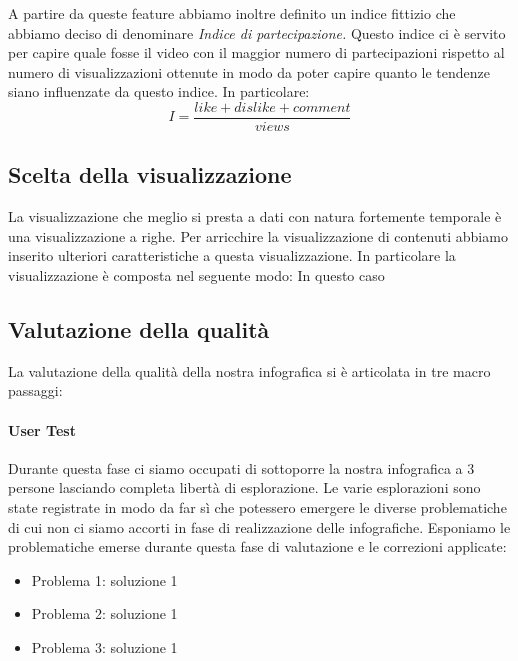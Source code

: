 \documentclass[10pt, a4paper,openany]{article}
\begin{document}
\begin{multicols}{2}
A partire da queste feature abbiamo inoltre definito un indice fittizio che abbiamo deciso di denominare \textit{Indice di partecipazione.} Questo indice ci è servito per capire quale fosse il video con il maggior numero di partecipazioni rispetto al numero di visualizzazioni ottenute in modo da poter capire quanto le tendenze siano influenzate da questo indice. In particolare:
\[ I = \frac{like+dislike+comment}{views}\]
\subsection*{Scelta della visualizzazione}
La visualizzazione che meglio si presta a dati con natura fortemente temporale è una visualizzazione a righe. Per arricchire la visualizzazione di contenuti abbiamo inserito ulteriori caratteristiche a questa visualizzazione. In particolare la visualizzazione è composta nel seguente modo:
In questo caso 
\subsection*{Valutazione della qualità}
La valutazione della qualità della nostra infografica si è articolata in tre macro passaggi:

\paragraph{User Test} Durante questa fase ci siamo occupati di sottoporre la nostra infografica a 3 persone lasciando completa libertà di esplorazione. Le varie esplorazioni sono state registrate in modo da far sì che potessero emergere le diverse problematiche di cui non ci siamo accorti in fase di realizzazione delle infografiche. Esponiamo le problematiche emerse durante questa fase di valutazione e le correzioni applicate:

\begin{itemize}
	\item Problema 1: soluzione 1
	\item Problema 2: soluzione 1
	\item Problema 3: soluzione 1
\end{itemize}

\end{multicols}
\end{document}
